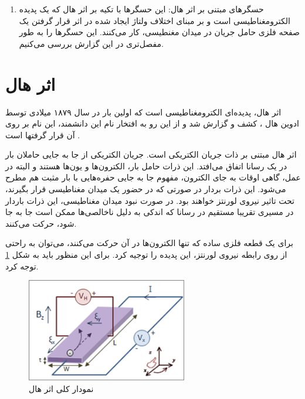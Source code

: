 \begin{enumerate}
	
	
	
	\item
	حسگر‌های مبتنی بر اثر هال:
	این حسگر‌ها با تکیه بر اثر هال که یک پدیده الکترومغناطیسی است و بر مبنای اختلاف ولتاژ ایجاد شده در اثر قرار گرفتن یک صفحه فلزی حامل جریان در میدان مغنطیسی، کار می‌کنند. این حسگر‌ها را به طور مفصل‌تری در این گزارش بررسی می‌کنیم.
	
	
	
	
\end{enumerate}



\section{اثر هال}

اثر هال، پدیده‌ای الکترومغناطیسی است که اولین بار در سال ۱۸۷۹ میلادی توسط ادوین هال
، کشف و گزارش شد و از این رو به افتخار نام این دانشمند، این نام بر روی آن قرار گرفتها است \cite{noauthor_hall_2021}.

اثر هال مبتنی بر ذات جریان الکتریکی است. جریان الکتریکی از جا به جایی حاملان بار در یک رسانا اتفاق می‌افتد. این ذرات حامل بار، الکترون‌ها و یون‌ها هستند و البته در عمل، گاهی‌ اوقات به جای الکترون، مفهوم جا به جایی حفره‌هایی با بار مثبت هم مطرح می‌شود. این ذرات بردار در صورتی که در حضور یک میدان مغناطیسی  قرار بگیرند، تحت تاثیر نیروی لورنتز خواهند بود. در صورت نبود میدان مغناطیسی، این ذرات باردار در مسیری تقریبا مستقیم در رسانا که اندکی به دلیل ناخالصی‌ها ممکن است جا به جا شود، حرکت می‌کنند.

برای یک قطعه فلزی ساده که تنها الکترون‌ها در آن حرکت می‌کنند، می‌توان به راحتی از روی رابطه نیروی لورنتز‌، این پدیده را توجیه کرد. برای این منظور باید به شکل \ref{fig:hall} توجه کرد.



\begin{figure}[t]
	
	\centering 
	\includegraphics[width=70mm]{Images/fig1.png}
	\caption{نمودار کلی اثر هال 
		\cite{noauthor_hall_2021}	
	}\label{fig:hall}
\end{figure}

